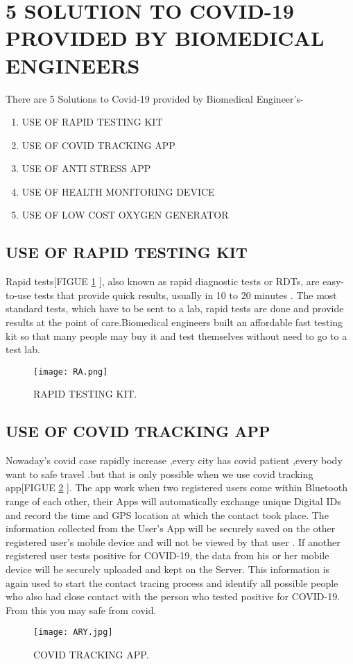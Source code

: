 \documentclass[12pt]{article}
\begin{document}
\section{5 SOLUTION TO COVID-19 PROVIDED BY BIOMEDICAL ENGINEERS}
There are 5  Solutions to Covid-19 provided by Biomedical Engineer's-
\begin{enumerate}
  \item USE OF RAPID TESTING KIT
 \item  USE OF COVID TRACKING APP
\item USE OF  ANTI STRESS APP
  \item USE OF HEALTH MONITORING DEVICE
 \item USE OF LOW COST OXYGEN GENERATOR
             
 \end{enumerate}
\clearpage
\subsection{USE OF RAPID TESTING KIT}
Rapid tests[FIGUE \ref{fig_RA} ], also known as rapid diagnostic tests or RDTs, are easy-to-use tests that provide quick results, usually in 10 to 20 minutes . The most standard tests, which have to be sent to a lab, rapid tests are done and provide results at the point of care.Biomedical engineers built an affordable fast testing kit so that many people may buy it and test themselves without need to go to a test  lab.
\begin{figure}[h]
\centering
\texttt{[image: RA.png]}
\caption{RAPID TESTING KIT.}
\label{fig_RA}
\end{figure}
\clearpage
\subsection{USE OF  COVID TRACKING APP}
Nowaday's covid case rapidly increase ,every city has covid patient ,every body want to safe travel .but that is only  possible when we use covid tracking app[FIGUE \ref{fig_ARY} ]. The app work when two registered users come within Bluetooth range of each other, their Apps will 
automatically exchange unique Digital IDs and record the time and GPS location at 
which the contact took place. The information collected from the User's App will be securely saved on the other registered user's mobile device and will not be viewed by that user . If another registered user tests positive for COVID-19, the data from his or her mobile device will be securely uploaded and kept on the Server.
This information is again used to start the contact tracing process and identify all possible people who also had close contact with the person who tested positive for COVID-19. From this you may safe from covid.
\begin{figure}[h]
\centering
\texttt{[image: ARY.jpg]}
\caption{COVID TRACKING APP.}
\label{fig_ARY}
\end{figure}
\clearpage
\end{document}
